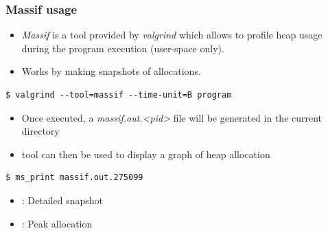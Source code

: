 \begin{frame}[fragile]
  \frametitle{Massif usage}
  \begin{itemize}
    \item {\em Massif} is a tool provided by {\em valgrind} which allows to profile
          heap usage during the program execution (user-space only).
    \item Works by making snapshots of allocations.
  \end{itemize}
  \begin{block}{}
    \begin{verbatim}
$ valgrind --tool=massif --time-unit=B program
    \end{verbatim}
  \end{block}
  \begin{itemize}
    \item Once executed, a {\em massif.out.<pid>} file will be generated in the
          current directory
    \item {} tool can then be used to display a graph of heap allocation
  \end{itemize}

  \begin{block}{}
    \begin{verbatim}
$ ms_print massif.out.275099
    \end{verbatim}
  \end{block}
  \begin{itemize}
    \item {}: Detailed snapshot
    \item \code{#}: Peak allocation
  \end{itemize}
\end{frame}

